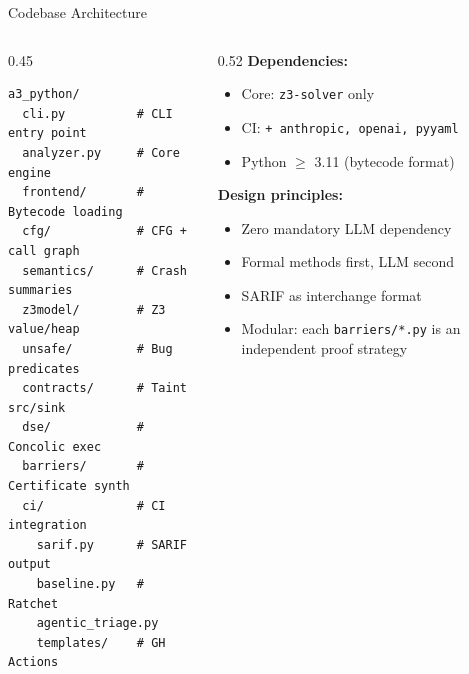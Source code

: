 \documentclass[aspectratio=169]{beamer}
\begin{document}
\begin{frame}[fragile]{Codebase Architecture}

\begin{columns}[T]
\begin{column}{0.45\textwidth}
\begin{lstlisting}[style=bash,basicstyle=\ttfamily\tiny]
a3_python/
  cli.py          # CLI entry point
  analyzer.py     # Core engine
  frontend/       # Bytecode loading
  cfg/            # CFG + call graph
  semantics/      # Crash summaries
  z3model/        # Z3 value/heap
  unsafe/         # Bug predicates
  contracts/      # Taint src/sink
  dse/            # Concolic exec
  barriers/       # Certificate synth
  ci/             # CI integration
    sarif.py      # SARIF output
    baseline.py   # Ratchet
    agentic_triage.py
    templates/    # GH Actions
\end{lstlisting}
\end{column}
\begin{column}{0.52\textwidth}
\textbf{Dependencies:}
\begin{itemize}\setlength\itemsep{1pt}
  \item Core: \texttt{z3-solver} only
  \item CI: \texttt{+ anthropic, openai, pyyaml}
  \item Python $\geq$ 3.11 (bytecode format)
\end{itemize}
\vspace{0.5em}
\textbf{Design principles:}
\begin{itemize}\setlength\itemsep{1pt}
  \item Zero mandatory LLM dependency
  \item Formal methods first, LLM second
  \item SARIF as interchange format
  \item Modular: each \texttt{barriers/*.py} is an independent proof strategy
\end{itemize}
\end{column}
\end{columns}

\end{frame}
\end{document}
